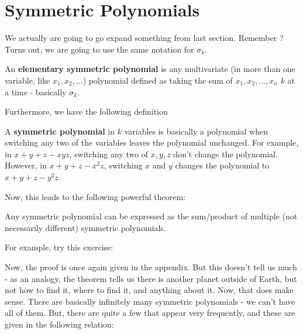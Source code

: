 \documentclass[11pt,titlepage]{scrartcl}
\newenvironment{hint}{\footnotesize \normalfont \textbf{Hints}:}{\hspace{-0.5ex}}
\begin{document}
\section{Symmetric Polynomials}
We actually are going to go expand something from last section. Remember ? Turns out, we are going to use the same notation for $\sigma_k$.
\begin{defn}
An \textbf{elementary symmetric polynomial} is any multivariate (in more than one variable, like $x_1,x_2,\ldots$) polynomial defined as taking the sum of $x_1,x_2,\ldots,x_n$ $k$ at a time - basically $\sigma_k$.
\end{defn}
Furthermore, we have the following definition
\begin{defn}
A \textbf{symmetric polynomial} in $k$ variables is basically a polynomial when switching any two of the variables leaves the polynomial unchanged. For example, in $x+y+z-xyz$, switching any two of $x,y,z$ don't change the polynomial. However, in $x+y+z-x^2z$, switching $x$ and $y$ changes the polynomial to $x+y+z-y^2z$.
\end{defn}
Now, this leads to the following powerful theorem:
\begin{theorem}\label{ftsp}
Any symmetric polynomial can be expressed as the sum/product of multiple (not necessarily different) symmetric polynomials.
\end{theorem}
For example, try this exercise:
\begin{exercisebox}
\end{exercisebox}
Now, the proof is once again given in the appendix. But this doesn't tell us much - as an analogy, the theorem tells us there is another planet outside of Earth, but not how to find it, where to find it, and anything about it. Now, that does make sense. There are basically infinitely many symmetric polynomials - we can't have all of them. But, there are quite a few that appear very frequently, and these are given in the following relation:
\end{document}
